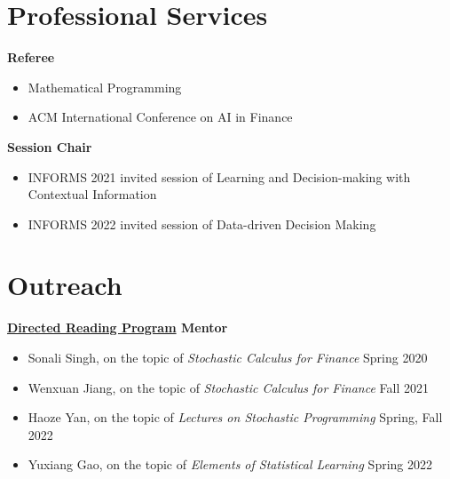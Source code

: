 \documentclass[margin,line]{res}
\newcommand{\vvspace}{\vspace{0.1in}}
\begin{document}
\begin{resume}

\section{\sc Professional Services}
{\bf Referee}
\vvspace
\begin{itemize}[leftmargin=0.15in]
\item Mathematical Programming 
\item ACM International Conference on AI in Finance
\end{itemize}
{\bf Session Chair}
\begin{itemize}[leftmargin=0.15in]
    \item INFORMS 2021 invited session of Learning and Decision-making with Contextual Information
    \item INFORMS 2022 invited session of Data-driven Decision Making
\end{itemize}



\section{\sc Outreach}
{\bf \href{https://web.ma.utexas.edu/users/drp/about.html}{Directed Reading Program} Mentor}
\vvspace
\begin{itemize}[leftmargin=0.15in]
\item Sonali Singh, on the topic of \textit{Stochastic Calculus for Finance} \hfill {Spring 2020}
\item Wenxuan Jiang, on the topic of \textit{Stochastic Calculus for Finance} \hfill {Fall 2021}
\item Haoze Yan, on the topic of \textit{Lectures on Stochastic Programming} \hfill {Spring, Fall 2022}
\item Yuxiang Gao, on the topic of \textit{Elements of Statistical Learning} \hfill {Spring 2022}
\end{itemize}



\end{resume}
\end{document}
